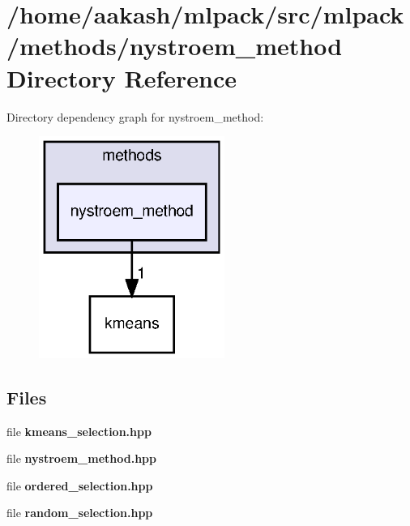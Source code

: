 \section{/home/aakash/mlpack/src/mlpack/methods/nystroem\+\_\+method Directory Reference}
\label{dir_0a2d8a1384666c530260fc12562b8d2a}
Directory dependency graph for nystroem\+\_\+method\+:
\nopagebreak
\begin{figure}[H]
\begin{center}
\leavevmode
\includegraphics[width=172pt]{dir_0a2d8a1384666c530260fc12562b8d2a_dep}
\end{center}
\end{figure}
\subsection*{Files}
\begin{DoxyCompactItemize}
\item 
file \textbf{ kmeans\+\_\+selection.\+hpp}
\item 
file \textbf{ nystroem\+\_\+method.\+hpp}
\item 
file \textbf{ ordered\+\_\+selection.\+hpp}
\item 
file \textbf{ random\+\_\+selection.\+hpp}
\end{DoxyCompactItemize}
